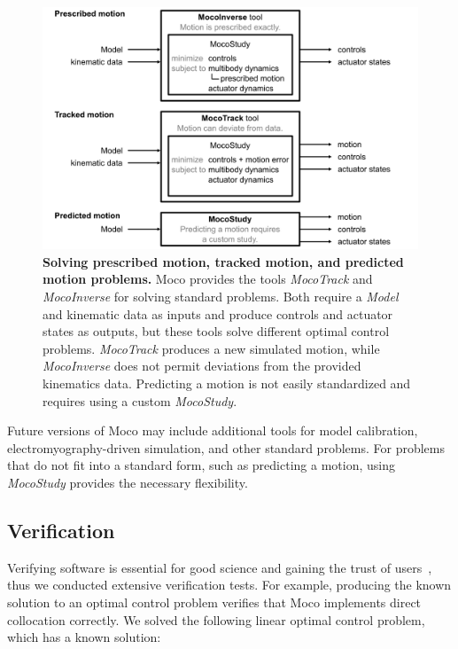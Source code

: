 \documentclass[10pt,letterpaper]{article}
\begin{document}
\begin{figure}[!h]
    \centering
    \includegraphics{../figures/MocoToolDiagram.png}
    \caption{{\bf Solving prescribed motion, tracked motion, and predicted motion problems.}
Moco provides the tools \textit{MocoTrack} and \textit{MocoInverse} for solving standard problems. Both require a \textit{Model} and kinematic data as inputs and produce controls and actuator states as outputs, but these tools solve different optimal control problems. \textit{MocoTrack} produces a new simulated motion, while \textit{MocoInverse} does not permit deviations from the provided kinematics data. Predicting a motion is not easily standardized and requires using a custom \textit{MocoStudy}.    }
    \label{mocotooldiagram}
\end{figure}

Future versions of Moco may include additional tools for model calibration, electromyography-driven simulation, and other standard problems. For problems that do not fit into a standard form, such as predicting a motion, using \textit{MocoStudy} provides the necessary flexibility.

\subsection*{Verification}

Verifying software is essential for good science and gaining the trust of users~\cite{Hicks:2015bo}, thus we conducted extensive verification tests. For example, producing the known solution to an optimal control problem verifies that Moco implements direct collocation correctly. We solved the following linear optimal control problem, which has a known solution:
\end{document}
